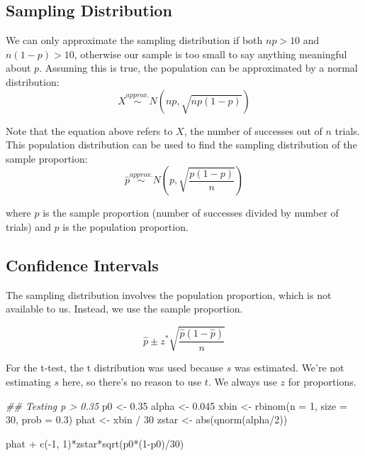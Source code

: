 \documentclass[
  letterpaper,
  DIV=11,
  numbers=noendperiod]{scrreprt}
\newenvironment{Shaded}{\begin{snugshade}}{\end{snugshade}}
\newcommand{\AttributeTok}[1]{\textcolor[rgb]{0.40,0.45,0.13}{#1}}
\newcommand{\DecValTok}[1]{\textcolor[rgb]{0.68,0.00,0.00}{#1}}
\newcommand{\DocumentationTok}[1]{\textcolor[rgb]{0.37,0.37,0.37}{\textit{#1}}}
\newcommand{\FloatTok}[1]{\textcolor[rgb]{0.68,0.00,0.00}{#1}}
\newcommand{\FunctionTok}[1]{\textcolor[rgb]{0.28,0.35,0.67}{#1}}
\newcommand{\NormalTok}[1]{\textcolor[rgb]{0.00,0.23,0.31}{#1}}
\newcommand{\OtherTok}[1]{\textcolor[rgb]{0.00,0.23,0.31}{#1}}
\newcommand{\SpecialCharTok}[1]{\textcolor[rgb]{0.37,0.37,0.37}{#1}}
\begin{document}
\hypertarget{sampling-distribution-3}{%
\subsection{Sampling Distribution}\label{sampling-distribution-3}}

We can only approximate the sampling distribution if both \(np>10\) and
\(n(1-p)>10\), otherwise our sample is too small to say anything
meaningful about \(p\). Assuming this is true, the population can be
approximated by a normal distribution: \[
X\stackrel{approx.}{\sim} N(np, \sqrt{np(1-p)})
\]

Note that the equation above refers to \(X\), the number of successes
out of \(n\) trials. This population distribution can be used to find
the sampling distribution of the sample proportion: \[
\hat p \stackrel{approx.}{\sim} N\left(p, \sqrt{\frac{p(1-p)}{n}}\right)
\]

where \(\hat p\) is the sample proportion (number of successes divided
by number of trials) and \(p\) is the population proportion.

\hypertarget{confidence-intervals-5}{%
\subsection{Confidence Intervals}\label{confidence-intervals-5}}

The sampling distribution involves the population proportion, which is
not available to us. Instead, we use the sample proportion.

\[
\hat p \pm z^*\sqrt{\frac{\hat p(1-\hat p)}{n}}
\]

For the t-test, the t distribution was used because \(s\) was estimated.
We're not estimating \(s\) here, so there's no reason to use \(t\). We
always use \(z\) for proportions.

\begin{Shaded}
\begin{Highlighting}[]
\DocumentationTok{\#\# Testing p \textgreater{} 0.35}
\NormalTok{p0 }\OtherTok{\textless{}{-}} \FloatTok{0.35}
\NormalTok{alpha }\OtherTok{\textless{}{-}} \FloatTok{0.045}
\NormalTok{xbin }\OtherTok{\textless{}{-}} \FunctionTok{rbinom}\NormalTok{(}\AttributeTok{n =} \DecValTok{1}\NormalTok{, }\AttributeTok{size =} \DecValTok{30}\NormalTok{, }\AttributeTok{prob =} \FloatTok{0.3}\NormalTok{)}
\NormalTok{phat }\OtherTok{\textless{}{-}}\NormalTok{ xbin }\SpecialCharTok{/} \DecValTok{30}
\NormalTok{zstar }\OtherTok{\textless{}{-}} \FunctionTok{abs}\NormalTok{(}\FunctionTok{qnorm}\NormalTok{(alpha}\SpecialCharTok{/}\DecValTok{2}\NormalTok{))}

\NormalTok{phat }\SpecialCharTok{+} \FunctionTok{c}\NormalTok{(}\SpecialCharTok{{-}}\DecValTok{1}\NormalTok{, }\DecValTok{1}\NormalTok{)}\SpecialCharTok{*}\NormalTok{zstar}\SpecialCharTok{*}\FunctionTok{sqrt}\NormalTok{(p0}\SpecialCharTok{*}\NormalTok{(}\DecValTok{1}\SpecialCharTok{{-}}\NormalTok{p0)}\SpecialCharTok{/}\DecValTok{30}\NormalTok{)}
\end{Highlighting}
\end{Shaded}
\end{document}
